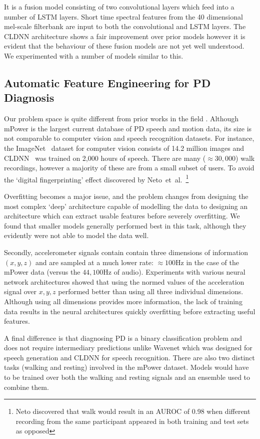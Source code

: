 \documentclass[12pt, twoside]{book}
\begin{document}
It is a fusion model consisting of two convolutional layers which feed into a number of LSTM layers. Short time spectral features from the 40 dimensional mel-scale filterbank are input to both the convolutional and LSTM layers. The CLDNN architecture shows a fair improvement over prior models however it is evident that the behaviour of these fusion models are not yet well understood. We experimented with a number of models similar to this.


\subsection{Automatic Feature Engineering for PD Diagnosis}

Our problem space is quite different from prior works in the field . Although mPower is the largest current database of PD speech and motion data, its size is not comparable to computer vision and speech recognition datasets. For instance, the ImageNet~\cite{imagenet} dataset for computer vision consists of 14.2 million images and CLDNN~\cite{convlstm} was trained on 2,000 hours of speech. There are many ($\approx30,000$) walk recordings, however a majority of these are from a small subset of users. To avoid the `digital fingerprinting' effect discovered by Neto~et~al.~\cite{mpowerneto2017analysis}\footnote{Neto discovered that walk would result in an AUROC of 0.98 when different recording from the same participant appeared in both training and test sets as opposed}

Overfitting becomes a major issue, and the problem changes from designing the most complex `deep' architecture capable of modelling the data to designing an architecture which can extract usable features before severely overfitting. We found that smaller models generally performed best in this task, although they evidently were not able to model the data well. 

Secondly, accelerometer signals contain contain three dimensions of information $(x,y,z)$ and are sampled at a much lower rate: $\approx100$Hz in the case of the mPower data (versus the $44,100$Hz of audio). Experiments with various neural network architectures showed that using the normed values of the acceleration signal over $x,y,z$ performed better than using all three individual dimensions. Although using all dimensions provides more information, the lack of training data results in the neural architectures quickly overfitting before extracting useful features. 

A final difference is that diagnosing PD is a binary classification problem and does not require intermediary predictions unlike Wavenet which was designed for speech generation and CLDNN for speech recognition. There are also two distinct tasks (walking and resting) involved in the mPower dataset. Models would have to be trained over both the walking and resting signals and an ensemble used to combine them.  
\end{document}
